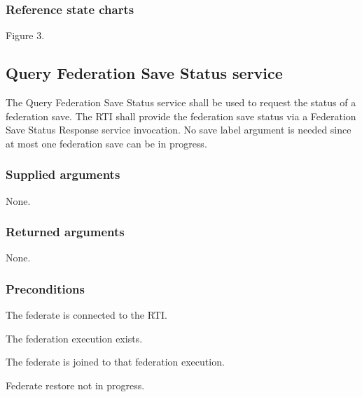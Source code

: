 \subsubsection{Reference state charts}

\begin{stdalphalist}
    \item Figure 3.
\end{stdalphalist}

\subsection{Query Federation Save Status service}

The Query Federation Save Status service shall be used to request the status of a federation save. The RTI shall provide the federation save status via a Federation Save Status Response \rtiinitiated{} service invocation. No save label argument is needed since at most one federation save can be in progress.

\subsubsection{Supplied arguments}

\begin{stdalphalist}
    \item None.
\end{stdalphalist}

\subsubsection{Returned arguments}

\begin{stdalphalist}
    \item None.
\end{stdalphalist}

\clearpage


\subsubsection{Preconditions}

\begin{stdalphalist}
    \item The federate is connected to the RTI.
    \item The federation execution exists.
    \item The federate is joined to that federation execution.
    \item Federate restore not in progress.
\end{stdalphalist}

